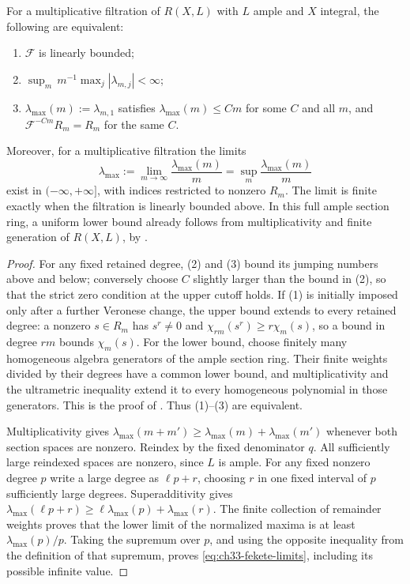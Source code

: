 \begin{lemma}
\label{lem:ch33-linear-bounded-equivalents}
For a multiplicative filtration of $R(X,L)$ with $L$ ample and $X$
integral, the following are equivalent:
\begin{enumerate}
\item $\mathcal F$ is linearly bounded;
\item $\sup_{m}\,m^{-1}\max_j|\lambda_{m,j}|<\infty$;
\item $\lambda_{\max}(m):=\lambda_{m,1}$ satisfies
 $\lambda_{\max}(m)\leq Cm$ for some $C$ and all $m$, and
 $\mathcal F^{-Cm}R_m=R_m$ for the same $C$.
\end{enumerate}
Moreover, for a multiplicative filtration the limits
\begin{equation}
\label{eq:ch33-fekete-limits}
 \lambda_{\max}:=\lim_{m\to\infty}\frac{\lambda_{\max}(m)}{m}
 =\sup_m\frac{\lambda_{\max}(m)}{m}
\end{equation}
exist in $(-\infty,+\infty]$, with indices restricted to nonzero
$R_m$.  The limit is finite exactly when the filtration is linearly
bounded above.  In this full ample section ring, a uniform lower bound
already follows from multiplicativity and finite generation of
$R(X,L)$, by \cite[Lemma~1.5]{BC11}.
\end{lemma}

\begin{proof}
For any fixed retained degree, (2) and (3) bound its jumping numbers
above and below; conversely choose $C$ slightly larger than the bound
in (2), so that the strict zero condition at the upper cutoff holds.
If (1) is initially imposed only after a further Veronese change,
the upper bound extends to every retained degree: a nonzero $s\in R_m$
has $s^r\ne0$ and $\chi_{rm}(s^r)\geq r\chi_m(s)$, so a bound in degree
$rm$ bounds $\chi_m(s)$.  For the lower bound, choose finitely many
homogeneous algebra generators of the ample section ring.  Their finite
weights divided by their degrees have a common lower bound, and
multiplicativity and the ultrametric inequality extend it to every
homogeneous polynomial in those generators.  This is the proof of
\cite[Lemma~1.5]{BC11}.  Thus (1)--(3) are equivalent.

Multiplicativity gives
$\lambda_{\max}(m+m')\geq\lambda_{\max}(m)+\lambda_{\max}(m')$
whenever both section spaces are nonzero.  Reindex by the fixed
denominator $q$.  All sufficiently large reindexed spaces are nonzero,
since $L$ is ample.  For any fixed nonzero degree $p$ write a large
degree as $\ell p+r$, choosing $r$ in one fixed interval of $p$
sufficiently large degrees.  Superadditivity gives
$\lambda_{\max}(\ell p+r)\geq\ell\lambda_{\max}(p)+\lambda_{\max}(r)$.
The finite collection of remainder weights proves that the lower
limit of the normalized maxima is at least
$\lambda_{\max}(p)/p$.  Taking the supremum over $p$, and using the
opposite inequality from the definition of that supremum, proves
\eqref{eq:ch33-fekete-limits}, including its possible infinite value.
\end{proof}

